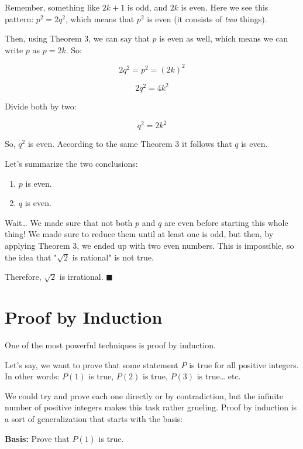 \documentclass[a4paper, justified, notitlepage, sfsidenotes, notoc]{tufte-book}
\begin{document}
Remember, something like \(2k + 1\) is odd, and \(2k\) is even. Here we see this pattern: \(p^2 = 2q^2\), which means that \(p^2\) is even (it consists of \emph{two} things).

Then, using Theorem 3, we can say that \(p\) is even as well, which means we can write \(p\) as \(p = 2k\). So:

$$ 2q^2 = p^2 = (2k)^2 $$

$$ 2q^2 = 4k^2 $$

Divide both by two:

$$ q^2 = 2k^2 $$

So, \(q^2\) is even. According to the same Theorem 3 it follows that \(q\) is even.

Let's summarize the two conclusions:

\begin{enumerate}
\item \(p\) is even.
\item \(q\) is even.
\end{enumerate}

Wait\ldots{} We made sure that not both \(p\) and \(q\) are even before starting this whole thing! We made sure to reduce them until at least one is odd, but then, by applying Theorem 3, we ended up with two even numbers. This is impossible, so the idea that "\(\sqrt{2}\) is rational" is not true.

Therefore, \(\sqrt{2}\) is irrational. \(\blacksquare\)

\section{Proof by Induction}
\label{sec:org0bc45f1}

One of the most powerful techniques is proof by induction.


Let's say, we want to prove that some statement \(P\) is true for all positive integers. In other words: \(P(1)\) is true, \(P(2)\) is true, \(P(3)\) is true\ldots{} etc.

We could try and prove each one directly or by contradiction, but the infinite number of positive integers makes this task rather grueling. Proof by induction is a sort of generalization that starts with the basis:

\textbf{Basis:} Prove that \(P(1)\) is true.
\end{document}
